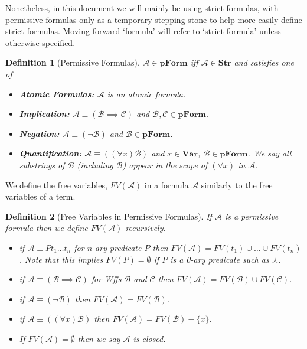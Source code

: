 \documentclass[12pt]{article}
\theoremstyle{break}
\newtheorem{definition}{Definition}[section]
\theoremstyle{break}
\theoremstyle{break}
\theoremstyle{break}
\newcommand{\mc}[1]{\mathcal{#1}}
\begin{document}
Nonetheless, in this document we will mainly be using strict formulas, with permissive formulas only as a temporary stepping stone to help more easily define strict formulas.
Moving forward `formula' will refer to `strict formula' unless otherwise specified.

\begin{definition}[Permissive Formulas]
$\mc{A} \in \textbf{pForm}$ iff $\mc{A} \in \textbf{Str}$ and satisfies one of 

\begin{itemize}
\item{\textbf{Atomic Formulas:} $\mc{A}$ is an atomic formula.}
\item{\textbf{Implication:} $\mc{A}\equiv (\mc{B}\implies \mc{C})$ and $\mc{B}, \mc{C} \in \textbf{pForm}$.}
\item{\textbf{Negation:} $\mc{A}\equiv (\lnot \mc{B})$ and $\mc{B} \in \textbf{pForm}$.}
\item{\textbf{Quantification:} $\mc{A}\equiv ((\forall x)\mc{B})$ and $x\in \textbf{Var}$, $\mc{B}\in \textbf{pForm}$. We say all substrings of $\mc{B}$ (including $\mc{B}$) appear in the scope of $(\forall x)$ in $\mc{A}$.} 
\end{itemize}
\end{definition}

We define the free variables, $FV(\mc{A})$ in a formula $\mc{A}$ similarly to the free variables of a term.

\begin{definition}[Free Variables in Permissive Formulas]
If $\mc{A}$ is a permissive formula then we define $FV(\mc{A})$ recursively.
\begin{itemize}
\item{if $\mc{A} \equiv Pt_1\ldots t_n$ for $n$-ary predicate $P$ then $FV(\mc{A}) = FV(t_1)\cup\ldots\cup FV(t_n)$. Note that this implies $FV(P)=\emptyset$ if $P$ is a 0-ary predicate such as $\curlywedge$.}
\item{if $\mc{A} \equiv (\mc{B}\implies \mc{C})$ for Wffs $\mc{B}$ and $\mc{C}$ then $FV(\mc{A}) = FV(\mc{B})\cup FV(\mc{C})$.}
\item{if $\mc{A} \equiv (\lnot\mc{B})$ then $FV(\mc{A}) = FV(\mc{B})$.}
\item{if $\mc{A} \equiv ((\forall x)\mc{B})$ then $FV(\mc{A}) = FV(\mc{B}) - \{x\}$.}
\item{If $FV(\mc{A}) = \emptyset$ then we say $\mc{A}$ is closed.}
\end{itemize}
\end{definition}
\end{document}
